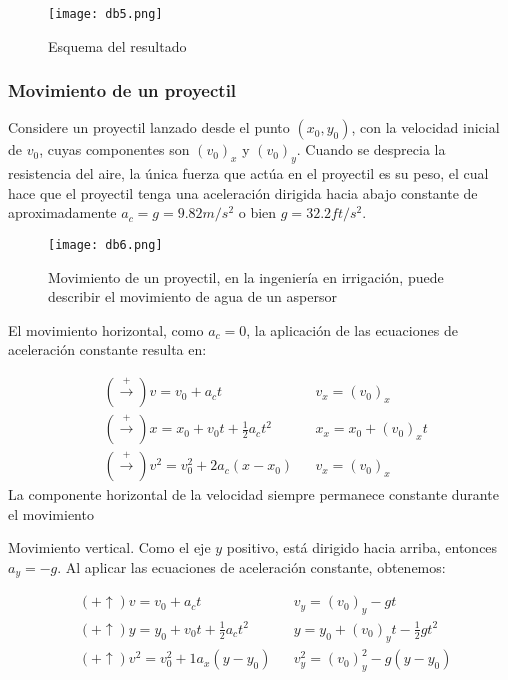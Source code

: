 \begin{figure}[h!]
  \centerline{\texttt{[image: db5.png]}}
  \caption{Esquema del resultado}
  \label{db5}
\end{figure}

\subsubsection{Movimiento de un proyectil}

Considere un proyectil lanzado desde el punto $(x_0,y_0)$, con la velocidad inicial de $v_0$, cuyas componentes son $(v_0)_x$ y $(v_0)_y$.
Cuando se desprecia la resistencia del aire, la única fuerza que actúa en el proyectil es su peso, el cual hace que el proyectil tenga una aceleración dirigida hacia abajo constante de aproximadamente
$a_c=g=9.82m/s^2$ o bien $g=32.2ft/s^2$.

\begin{figure}[h!]
  \centerline{\texttt{[image: db6.png]}}
  \caption{Movimiento de un proyectil, en la ingeniería en irrigación, puede describir el movimiento de agua de un aspersor}
  \label{db6}
\end{figure}

El movimiento horizontal, como $a_c=0$, la aplicación de las ecuaciones de aceleración constante resulta en: 

\begin{align*}
&\left(\overset{+}{\longrightarrow }\right)v=v_0+a_ct&&v_x=(v_0)_x\\
&\left(\overset{+}{\longrightarrow }\right)x=x_0+v_0t+\frac{1}{2}a_ct^2&&x_x=x_0+(v_0)_xt\\
&\left(\overset{+}{\longrightarrow }\right)v^2=v_0^2+2a_c\left(x-x_0\right)&&v_x=(v_0)_x
\end{align*}
La componente horizontal de la velocidad siempre permanece constante durante el movimiento

Movimiento vertical. Como el eje $y$ positivo, está dirigido hacia arriba, entonces $a_y=-g$. Al aplicar las ecuaciones de aceleración constante, obtenemos:

\begin{align*}
    &(+\uparrow )v=v_0+a_ct&&v_y=(v_0)_y-gt\\
    &(+\uparrow )y=y_0+v_0t+\frac{1}{2}a_ct^2&&y=y_0+(v_0)_yt-\frac{1}{2}gt^2\\
    &(+\uparrow )v^2=v_0^2+1a_x\left(y-y_0\right)&&v^2_y=(v_0)^2_y-g\left(y-y_0\right)
\end{align*}

